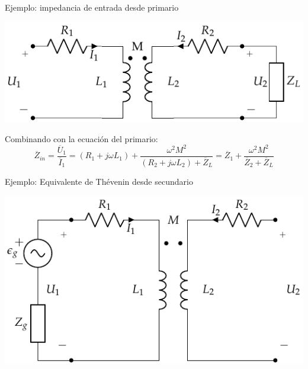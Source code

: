 \documentclass[aspectratio=169, usenames,svgnames,dvipsnames]{beamer}
\begin{document}
\begin{frame}[label={sec:orgf42cdec}]{Ejemplo: impedancia de entrada desde primario}
\begin{center}
\includegraphics[height=0.45\textheight]{../figs/Trafo_Real_ImpSec.pdf}
\end{center}
Combinando con la ecuación del primario:
\[
  \overline{Z}_{in}  = \frac{\overline{U}_1}{\overline{I}_1} =  (R_1 + j \omega L_1) + \frac{\omega^2 M^2}{(R_2 + j \omega L_2) + \overline{Z}_L} = \boxed{\overline{Z}_1 + \frac{\omega^2 M^2}{\overline{Z}_2 + \overline{Z}_L}}
\]
\end{frame}

\begin{frame}[label={sec:org0838713}]{Ejemplo: Equivalente de Thévenin desde secundario}
\begin{center}
\includegraphics[height=0.8\textheight]{../figs/Trafo_Real_FuentePrimario.pdf}
\end{center}
\end{frame}
\end{document}
